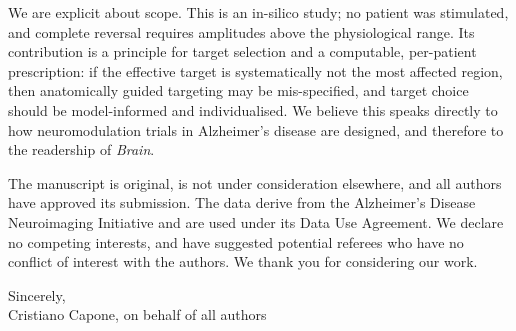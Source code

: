 \documentclass[11pt]{article}
\begin{document}
We are explicit about scope. This is an in-silico study; no patient was
stimulated, and complete reversal requires amplitudes above the physiological
range. Its contribution is a principle for target selection and a computable,
per-patient prescription: if the effective target is systematically not the most
affected region, then anatomically guided targeting may be mis-specified, and
target choice should be model-informed and individualised. We believe this speaks
directly to how neuromodulation trials in Alzheimer's disease are designed, and
therefore to the readership of \textit{Brain}.

The manuscript is original, is not under consideration elsewhere, and all authors
have approved its submission. The data derive from the Alzheimer's Disease
Neuroimaging Initiative and are used under its Data Use Agreement. We declare no
competing interests, and have suggested potential referees who have no conflict
of interest with the authors. We thank you for considering our work.

\vspace{1em}
{\raggedright
Sincerely,\\[0.3em]
Cristiano Capone, on behalf of all authors\par}
\end{document}
